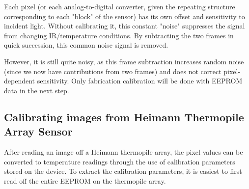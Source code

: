 \documentclass[thesis]{deutez}
\begin{document}
Each pixel (or each analog-to-digital converter, given the repeating structure corresponding to each "block" of the sensor) has its own offset and sensitivity to incident light. Without calibrating it, this constant "noise" suppresses the signal from changing IR/temperature conditions. By subtracting the two frames in quick succession, this common noise signal is removed.

However, it is still quite noisy, as this frame subtraction increases random noise (since we now have contributions from two frames) and does not correct pixel-dependent sensitivity.
Only fabrication calibration will be done with EEPROM data in the next step.

\subsection{Calibrating images from Heimann Thermopile Array Sensor}

After reading an image off a Heimann thermopile array, the pixel values can be converted to temperature readings through the use of calibration parameters stored on the device. To extract the calibration parameters, it is easiest to first read off the entire EEPROM on the thermopile array.
\end{document}

